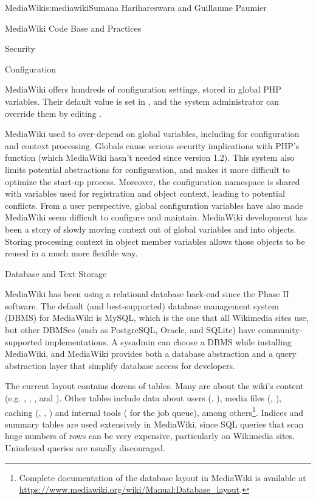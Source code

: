 \begin{aosachapter}{MediaWiki}{s:mediawiki}{Sumana Harihareswara and Guillaume Paumier}
\begin{aosasect1}{MediaWiki Code Base and Practices}
\begin{aosasect2}{Security}
\end{aosasect2}

\begin{aosasect2}{Configuration}

MediaWiki offers hundreds of configuration settings, stored in global
PHP variables. Their default value is set in
, and the system administrator can override
them by editing .

MediaWiki used to over-depend on global variables, including for
configuration and context processing. Globals cause serious security
implications with PHP's  function (which
MediaWiki hasn't needed since version 1.2). This system also limits
potential abstractions for configuration, and makes it more difficult
to optimize the start-up process. Moreover, the configuration
namespace is shared with variables used for registration and object
context, leading to potential conflicts. From a user perspective,
global configuration variables have also made MediaWiki seem difficult
to configure and maintain. MediaWiki development has been a story of
slowly moving context out of global variables and into
objects. Storing processing context in object member variables allows
those objects to be reused in a much more flexible way.

\end{aosasect2}

\end{aosasect1}

\begin{aosasect1}{Database and Text Storage}


MediaWiki has been using a relational database back-end since the
Phase II software. The default (and best-supported) database
management system (DBMS) for MediaWiki is MySQL, which is the one that
all Wikimedia sites use, but other DBMSes (such as PostgreSQL, Oracle,
and SQLite) have community-supported implementations. A sysadmin can
choose a DBMS while installing MediaWiki, and MediaWiki provides both
a database abstraction and a query abstraction layer that simplify
database access for developers.

The current layout contains dozens of tables. Many are about the
wiki's content (e.g. , , ,
and ). Other tables include data about users
(, ), media files (,
), caching (, ,
) and internal tools ( for the job queue),
among others\footnote{Complete documentation of the database layout in
  MediaWiki is available at
  \url{https://www.mediawiki.org/wiki/Manual:Database\_layout}.}. Indices
and summary tables are used extensively in MediaWiki, since SQL
queries that scan huge numbers of rows can be very expensive,
particularly on Wikimedia sites. Unindexed queries are usually
discouraged.


\end{aosasect1}
\end{aosachapter}

